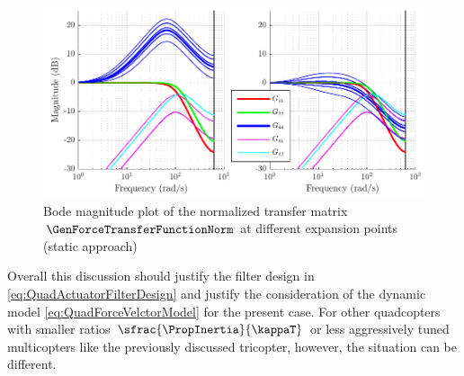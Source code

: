 \begin{figure}[ht]
 \centering
 \includegraphics{graphics/QuadActuatorDynamics/BodeQuadActorDynTraditional.pdf}
 \caption{Bode magnitude plot of the normalized transfer matrix $\GenForceTransferFunctionNorm$ at different expansion points (static approach)}
 \label{fig:BodeQuadActorDynTraditional}
\end{figure}

Overall this discussion should justify the filter design in \eqref{eq:QuadActuatorFilterDesign} and justify the consideration of the dynamic model \eqref{eq:QuadForceVelctorModel} for the present case.
For other quadcopters with smaller ratios $\sfrac{\PropInertia}{\kappaT}$ or less aggressively tuned multicopters like the previously discussed tricopter, however, the situation can be different.


